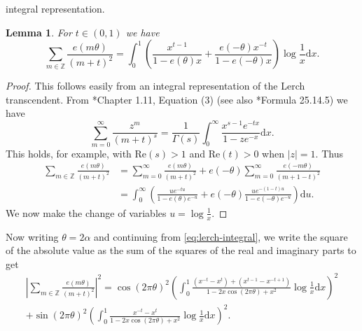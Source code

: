 \documentclass[12pt, a4paper]{amsart}
\newtheorem{lemma}{Lemma}
\theoremstyle{remark}
\newcommand{\ud}{\mathrm{d}}
\newcommand{\dx}{\mathrm{d}x}
\newcommand{\abs}[1]{\left|#1\right|}
\newcommand{\real}{\mathrm{Re}}
\begin{document}
integral representation.
\begin{lemma} For $t \in (0,1)$ we have
    \begin{equation}\label{eq:lerch-integral}
    \sum_{m\in\mathbb Z}\frac{e( m\theta)}{(m+t)^2}
        = \int_0^1\left(\frac{x^{t-1}}{1-e(\theta)x} + \frac{e(-\theta)x^{-t}}{1-e(-\theta)x}\right) \log \frac{1}{x}\dx.
    \end{equation}
\end{lemma}
\begin{proof}
    This follows easily from an integral representation of the Lerch transcendent.
    From \cite{EMOT1}*{Chapter 1.11, Equation (3)} (see also \cite{NIST:DLMF}*{Formula 25.14.5})
    we have
    \[
        \sum_{m=0}^\infty \frac{z^m}{(m + t)^s}
             = \frac{1}{\Gamma(s)} \int_0^\infty \frac{x^{s-1}e^{-tx}}{1 - ze^{-x}}\ud x.
    \]
    This holds, for example, with $\real(s) > 1$ and $\real(t) > 0$ when $\abs{z} = 1$. Thus
\begin{align*}
    \sum_{m\in\mathbb Z}\frac{e(m\theta)}{(m+t)^2}
        &= \sum_{m=0}^\infty \frac{e(m\theta)}{(m+t)^2} +
            e(-\theta) \sum_{m=0}^\infty \frac{e(-m\theta)}{(m+1-t)^2} \\
        &=\int_0^\infty \left(\frac{ue^{-tu}}{1-e(\theta)e^{-u}}
        + e(-\theta)\frac{ue^{-(1-t)u}}{1-e(-\theta)e^{-u}}\right)\ud u.
\end{align*}
We now make the change of variables $u = \log \frac{1}{x}$.
\end{proof}

Now writing $\theta = 2\alpha$ and continuing from
\eqref{eq:lerch-integral}, we write the square of the absolute value as
the sum of the squares of the real and imaginary parts to get
\begin{multline*}
    \left\lvert\sum_{m\in\mathbb Z}\frac{e( m\theta)}{(m+t)^2}\right\rvert^2
        = \cos(2\pi \theta)^2\left( \int_0^1 \frac{(x^{-t}-x^{t}) + (x^{t-1} - x^{-t+1})}{1-2x\cos(2\pi \theta) + x^2}\log\frac1 x\dx\right)^2  \\
         + \sin(2\pi\theta)^2\left(\int_0^1 \frac{x^{-t}-x^{t}}{1-2x\cos(2\pi \theta) + x^2}\log\frac1 x\dx\right)^2.
 \end{multline*}
\end{document}
